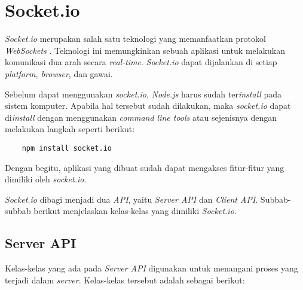 
\section{Socket.io}
\label{sec:Socket.io}

\textit{Socket.io} merupakan salah satu teknologi yang memanfaatkan protokol \textit{WebSockets} \cite{socketio}. Teknologi ini memungkinkan sebuah aplikasi untuk melakukan komunikasi dua arah secara \textit{real-time}. \textit{Socket.io} dapat dijalankan di setiap \textit{platform, browser}, dan gawai.

Sebelum dapat menggunakan \textit{socket.io}, \textit{Node.js} harus sudah ter\textit{install} pada sistem komputer. Apabila hal tersebut sudah dilakukan, maka \textit{socket.io} dapat di\textit{install} dengan menggunakan \textit{command line tools} atau sejenisnya dengan melakukan langkah seperti berikut:
\begin{lstlisting}
	npm install socket.io
\end{lstlisting}

Dengan begitu, aplikasi yang dibuat sudah dapat mengakses fitur-fitur yang dimiliki oleh \textit{socket.io}.

\textit{Socket.io} dibagi menjadi dua \textit{API}, yaitu \textit{Server API} dan \textit{Client API}. Subbab-subbab berikut menjelaskan kelas-kelas yang dimiliki \textit{Socket.io}.

\subsection{Server API}
Kelas-kelas yang ada pada \textit{Server API} digunakan untuk menangani proses yang terjadi dalam \textit{server}\cite{socketioserver}. Kelas-kelas tersebut adalah sebagai berikut:

